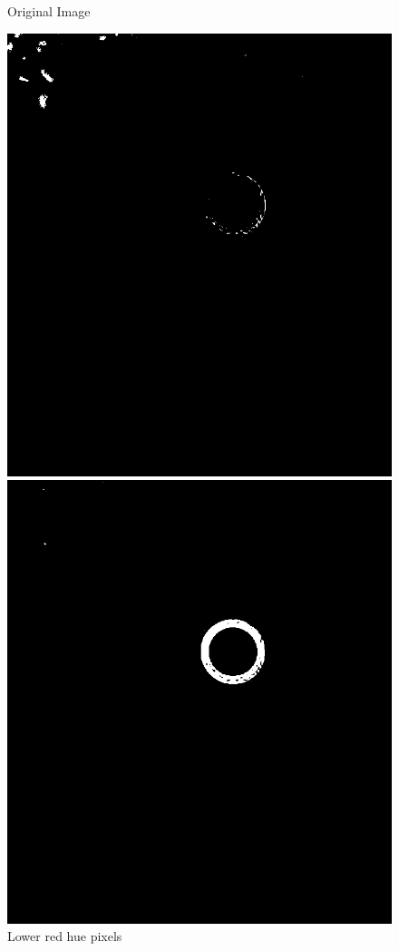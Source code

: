 \begin{figure}[H]
	\caption{Original Image\protect\footnotemark}\label{fig:original_image}
	\endminipage\hfill
	\includegraphics[width=\linewidth]{images/lowerred.png}
	\caption{Lower red hue pixels}\label{fig:lower_red}
	\endminipage\hfill
	\includegraphics[width=\linewidth]{images/upperred.png}

\end{figure}
